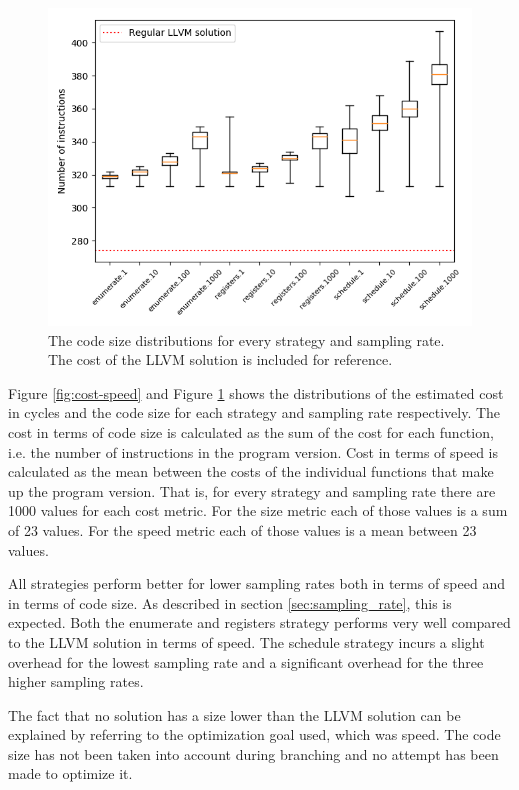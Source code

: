 \begin{figure}[ht]
	\centering
	\includegraphics[width=\textwidth,height=0.5\textheight]{results/figures/cost_size}
	\caption{The code size distributions for every strategy and sampling rate. The cost of the LLVM solution is included for reference.}
	\label{fig:cost-size}
\end{figure}

Figure \ref{fig:cost-speed} and Figure \ref{fig:cost-size} shows the distributions of the
estimated cost in cycles and the code size for each strategy and sampling rate
respectively. The cost in terms of code size is calculated as the sum of the cost for each
function, i.e. the number of instructions in the program version. Cost in terms of speed
is calculated as the mean between the costs of the individual functions that make
up the program version. That is, for every strategy and sampling rate there are 1000
values for each cost metric. For the size metric each of those values is a sum of 23
values. For the speed metric each of those values is a mean between 23 values.

All strategies perform better for lower sampling rates both in terms of speed and in terms
of code size. As described in section \ref{sec:sampling_rate}, this is expected. Both the
enumerate and registers strategy performs very well compared to the LLVM solution
in terms of speed. The schedule strategy incurs a slight overhead for the lowest sampling
rate and a significant overhead for the three higher sampling rates.

The fact that no solution has a size lower than the LLVM solution can be explained by
referring to the optimization goal used, which was speed. The code size has not been taken
into account during branching and no attempt has been made to optimize it.

